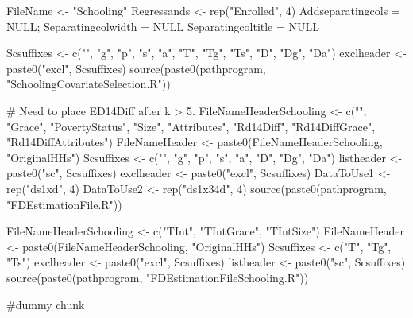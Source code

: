 \begin{Schunk}
\begin{Sinput}
FileName <- "Schooling"
Regressands <- rep("Enrolled", 4)
Addseparatingcols = NULL; Separatingcolwidth = NULL
Separatingcoltitle = NULL
\end{Sinput}
\end{Schunk}
\begin{Schunk}
\begin{Sinput}
Scsuffixes <- c("", "g", "p", "s", "a", "T", "Tg", "Ts", "D", "Dg", "Da")
exclheader <- paste0("excl", Scsuffixes)
source(paste0(pathprogram, "SchoolingCovariateSelection.R"))
\end{Sinput}
\end{Schunk}
\begin{Schunk}
\begin{Sinput}
# Need to place ED14Diff after k > 5.
FileNameHeaderSchooling <- c("", "Grace", "PovertyStatus", "Size", "Attributes",
  "Rd14Diff", "Rd14DiffGrace", "Rd14DiffAttributes")
FileNameHeader <- paste0(FileNameHeaderSchooling, "OriginalHHs")
Scsuffixes <- c("", "g", "p", "s", "a", "D", "Dg", "Da")
listheader <- paste0("sc", Scsuffixes)
exclheader <- paste0("excl", Scsuffixes)
DataToUse1 <- rep("ds1xd", 4)
DataToUse2 <- rep("ds1x34d", 4)
source(paste0(pathprogram, "FDEstimationFile.R"))
\end{Sinput}
\end{Schunk}
\begin{Schunk}
\begin{Sinput}
FileNameHeaderSchooling <- c("TInt", "TIntGrace", "TIntSize")
FileNameHeader <- paste0(FileNameHeaderSchooling, "OriginalHHs")
Scsuffixes <- c("T", "Tg", "Ts")
exclheader <- paste0("excl", Scsuffixes)
listheader <- paste0("sc", Scsuffixes)
source(paste0(pathprogram, "FDEstimationFileSchooling.R"))
\end{Sinput}
\end{Schunk}
\begin{Schunk}
\begin{Sinput}
#dummy chunk
\end{Sinput}
\end{Schunk}

